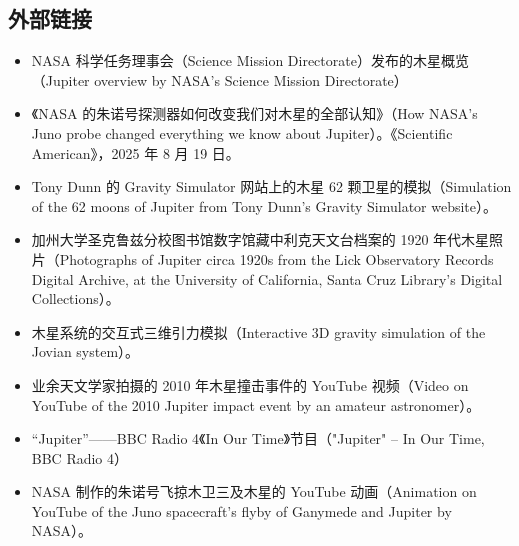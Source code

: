 \subsection{外部链接}
\begin{itemize}
\item NASA 科学任务理事会（Science Mission Directorate）发布的木星概览（Jupiter overview by NASA's Science Mission Directorate）
\item 《NASA 的朱诺号探测器如何改变我们对木星的全部认知》（How NASA's Juno probe changed everything we know about Jupiter）。《Scientific American》，2025 年 8 月 19 日。
\item Tony Dunn 的 Gravity Simulator 网站上的木星 62 颗卫星的模拟（Simulation of the 62 moons of Jupiter from Tony Dunn's Gravity Simulator website）。
\item 加州大学圣克鲁兹分校图书馆数字馆藏中利克天文台档案的 1920 年代木星照片（Photographs of Jupiter circa 1920s from the Lick Observatory Records Digital Archive, at the University of California, Santa Cruz Library's Digital Collections）。
\item 木星系统的交互式三维引力模拟（Interactive 3D gravity simulation of the Jovian system）。
\item 业余天文学家拍摄的 2010 年木星撞击事件的 YouTube 视频（Video on YouTube of the 2010 Jupiter impact event by an amateur astronomer）。
\item “Jupiter”——BBC Radio 4《In Our Time》节目（"Jupiter" – In Our Time, BBC Radio 4）
\item NASA 制作的朱诺号飞掠木卫三及木星的 YouTube 动画（Animation on YouTube of the Juno spacecraft's flyby of Ganymede and Jupiter by NASA）。
\end{itemize}